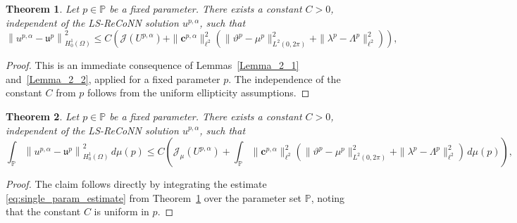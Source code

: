 \documentclass[oneside]{article}
\newtheorem{theorem}{Theorem}[section]
\begin{document}
\begin{theorem}\label{Theorem_single}
Let \( p \in \mathbb{P} \) be a fixed parameter. There exists a constant $C > 0$, independent of the LS-ReCoNN solution $u^{p, \alpha}$, such that
\begin{equation}\label{eq:single_param_estimate}
\left\| u^{p, \alpha} - \mathfrak{u}^p \right\|_{H_0^1(\Omega)}^2 
\leq C \left( \mathcal{J}(U^{p, \alpha})
+ \| \mathbf{c}^{p, \alpha}\|_{\ell ^2}^2 \left( \| \vartheta ^p - \mu^p \|_{L^2(0, 2\pi)}^2 + \| \lambda^p - \Lambda^p \|_{\ell ^2}^2 \right) \right) ,
\end{equation}
\end{theorem}

\begin{proof}
This is an immediate consequence of Lemmas~\ref{Lemma_2_1} and~\ref{Lemma_2_2}, applied for a fixed parameter \(p\).  
The independence of the constant \(C\) from \(p\) follows from the uniform ellipticity assumptions.
\end{proof}

{\begin{theorem}\label{Theorem_parametric}
Let \( p \in \mathbb{P} \) be a fixed parameter. There exists a constant $C > 0$, independent of the LS-ReCoNN solution $u^{p, \alpha}$, such that
\begin{equation}\label{eq:parametric_estimate}
\int_{\mathbb{P}} \left\| u^{p, \alpha} - \mathfrak{u}^p \right\|_{H_0^1(\Omega)}^2 \, d\mu(p)
\leq C \left( \mathcal{J}_\mu(U^{p, \alpha})
+ \int_{\mathbb{P}} \| \mathbf{c}^{p, \alpha}\|_{\ell ^2}^2 \left( \| \vartheta ^p - \mu^p \|_{L^2(0, 2\pi)}^2 + \| \lambda^p - \Lambda^p \|_{\ell ^2}^2 \right) \, d\mu(p)\right) ,
\end{equation}
\end{theorem}
}

\begin{proof}
The claim follows directly by integrating the estimate 
\eqref{eq:single_param_estimate} from Theorem~\ref{Theorem_single} over 
the parameter set \(\mathbb{P}\), noting that the constant \( C \) is uniform in \( p \).
\end{proof}






\end{document}
